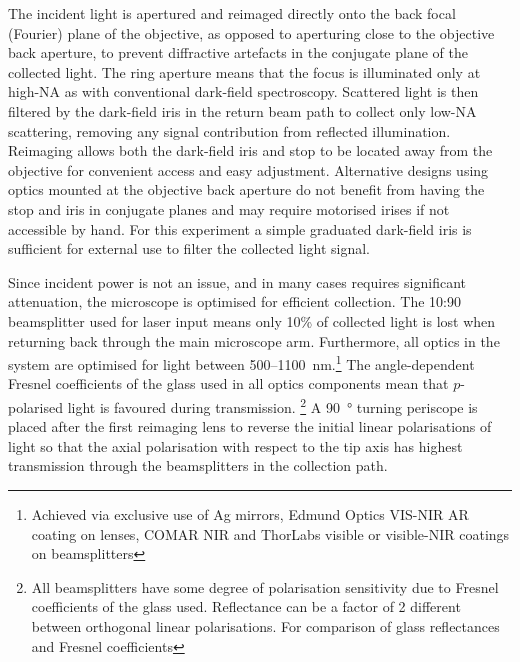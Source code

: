 \documentclass{article}
\begin{document}
The incident light is apertured and reimaged directly onto the back focal (Fourier) plane of the objective, as opposed to aperturing close to the objective back aperture, to prevent diffractive artefacts in the conjugate plane of the collected light. The ring aperture means that the focus is illuminated only at high-NA as with conventional dark-field spectroscopy. Scattered light is then filtered by the dark-field iris in the return beam path to collect only low-NA scattering, removing any signal contribution from reflected illumination.
Reimaging allows both the dark-field iris and stop to be located away from the objective for convenient access and easy adjustment. Alternative designs using optics mounted at the objective back aperture do not benefit from having the stop and iris in conjugate planes and may require motorised irises if not accessible by hand. For this experiment a simple graduated dark-field iris is sufficient for external use to filter the collected light signal.

Since incident power is not an issue, and in many cases requires significant attenuation, the microscope is optimised for efficient collection. The 10:90 beamsplitter used for laser input means only 10\% of collected light is lost when returning back through the main microscope arm. Furthermore, all optics in the system are optimised for light between 500--\SI{1100}{nm}.\footnote{Achieved via exclusive use of Ag mirrors, Edmund Optics VIS-NIR AR coating on lenses, COMAR NIR and ThorLabs visible or visible-NIR coatings on beamsplitters} The angle-dependent Fresnel coefficients of the glass used in all optics components mean that $p$-polarised light is favoured during transmission.%
\footnote{All beamsplitters have some degree of polarisation sensitivity due to Fresnel coefficients of the glass used. Reflectance can be a factor of 2 different between orthogonal linear polarisations. For comparison of glass reflectances and Fresnel coefficients}
A \SI{90}{\degree} turning periscope is placed after the first reimaging lens to reverse the initial linear polarisations of light so that the axial polarisation with respect to the tip axis has highest transmission through the beamsplitters in the collection path.
\end{document}
